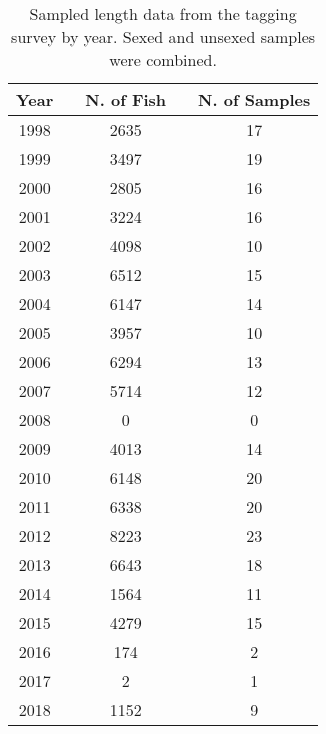 \begingroup\fontsize{10}{12}\selectfont
\begingroup\fontsize{10}{12}\selectfont


\begin{table}[]
\caption{Sampled length data from the tagging survey by year. Sexed and unsexed samples were combined.}
\label{tab:survey_sample_indices}
\begin{tabular}{ccccc}
\hline
\multicolumn{1}{l}{Year} & \multicolumn{1}{l}{} & \multicolumn{1}{l}{N. of Fish} & \multicolumn{1}{l}{} & \multicolumn{1}{l}{N. of Samples} \\ \hline
1998 &  & 2635 &  & 17 \\
1999 &  & 3497 &  & 19 \\
2000 &  & 2805 &  & 16 \\
2001 &  & 3224 &  & 16 \\
2002 &  & 4098 &  & 10 \\
2003 &  & 6512 &  & 15 \\
2004 &  & 6147 &  & 14 \\
2005 &  & 3957 &  & 10 \\
2006 &  & 6294 &  & 13 \\
2007 &  & 5714 &  & 12 \\
2008 &  & 0 &  & 0 \\
2009 &  & 4013 &  & 14 \\
2010 &  & 6148 &  & 20 \\
2011 &  & 6338 &  & 20 \\
2012 &  & 8223 &  & 23 \\
2013 &  & 6643 &  & 18 \\
2014 &  & 1564 &  & 11 \\
2015 &  & 4279 &  & 15 \\
2016 &  & 174 &  & 2 \\
2017 &  & 2 &  & 1 \\
2018 &  & 1152 &  & 9 \\ \hline
\end{tabular}
\end{table}
\endgroup{}
\endgroup{}

